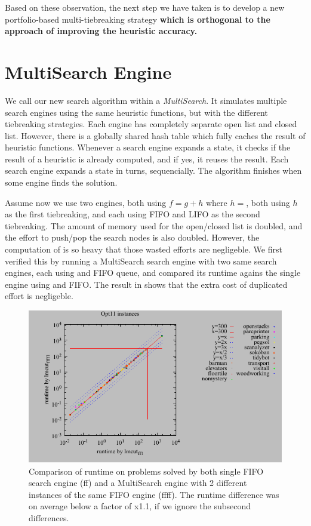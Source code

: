 Based on these observation, the next step we have taken is to develop a new
portfolio-based multi-tiebreaking strategy \textbf{which is orthogonal to
the approach of improving the heuristic accuracy.}

\section{MultiSearch Engine}

We call our new search algorithm within \astar a \emph{MultiSearch}.
It simulates multiple search engines using the same heuristic functions,
but with the different tiebreaking strategies.  Each engine has completely
separate open list and closed list.  However, there is a
globally shared hash table which fully caches the result of heuristic
functions.  Whenever a search engine expands a state, it checks if the
result of a heuristic is already computed, and if yes, it reuses the
result.  Each search engine expands a state in turns, sequencially. The algorithm
finishes when some engine finds the solution.

Assume now we use two \astar engines, both using $f=g+h$ where $h=$\lmcut, both using $h$ as the first tiebreaking, and each using FIFO and LIFO as the second tiebreaking.
The amount of memory used for the open/closed list is doubled, and the effort to push/pop the search nodes is also doubled.
However, the computation of \lmcut is so heavy that those wasted efforts are negligeble.
We first verified this by running a MultiSearch search engine with two same search engines, each using \lmcut and FIFO queue, and compared its runtime agains the single engine using \lmcut and FIFO. The result in  shows that the extra cost of duplicated effort is negligeble.

\begin{figure}[htbp]
 \centering
 \includegraphics{tables/opt11-time-lmcut_ff-lmcut_ffff.pdf}
 \caption{Comparison of runtime on problems solved by both single FIFO search engine (ff) and a MultiSearch engine with 2 different instances of the same FIFO engine (ffff). The runtime difference was on average below a factor of x1.1, if we ignore the subsecond differences.}
 \label{ffff}
\end{figure}

